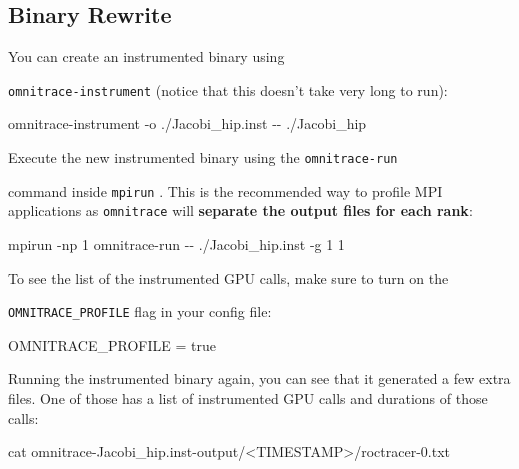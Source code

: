 \documentclass[
]{article}
\let\oldtexttt\texttt
\renewcommand{\texttt}[1]{
  \colorbox{Light}{\oldtexttt{#1}}
}
\newenvironment{Shaded}{}{}
\newcommand{\ExtensionTok}[1]{#1}
\newcommand{\FunctionTok}[1]{\textcolor[rgb]{0.02,0.16,0.49}{#1}}
\newcommand{\NormalTok}[1]{#1}
\newcommand{\OperatorTok}[1]{\textcolor[rgb]{0.40,0.40,0.40}{#1}}
\begin{document}
\hypertarget{binary-rewrite}{%
\subsection{Binary Rewrite}\label{binary-rewrite}}

You can create an instrumented binary using
\texttt{omnitrace-instrument} (notice that this doesn't take very long
to run):

\begin{Shaded}
\begin{Highlighting}[]
\ExtensionTok{omnitrace{-}instrument}\NormalTok{ {-}o ./Jacobi\_hip.inst {-}{-} ./Jacobi\_hip}
\end{Highlighting}
\end{Shaded}

Execute the new instrumented binary using the \texttt{omnitrace-run}
command inside \texttt{mpirun}. This is the recommended way to profile
MPI applications as \texttt{omnitrace} will \textbf{separate the output
files for each rank}:

\begin{Shaded}
\begin{Highlighting}[]
\ExtensionTok{mpirun}\NormalTok{ {-}np 1 omnitrace{-}run {-}{-} ./Jacobi\_hip.inst {-}g 1 1}
\end{Highlighting}
\end{Shaded}

To see the list of the instrumented GPU calls, make sure to turn on the
\texttt{OMNITRACE\_PROFILE} flag in your config file:

\begin{Shaded}
\begin{Highlighting}[]
\ExtensionTok{OMNITRACE\_PROFILE}\NormalTok{                                  = true}
\end{Highlighting}
\end{Shaded}

Running the instrumented binary again, you can see that it generated a
few extra files. One of those has a list of instrumented GPU calls and
durations of those calls:

\begin{Shaded}
\begin{Highlighting}[]
\FunctionTok{cat}\NormalTok{ omnitrace{-}Jacobi\_hip.inst{-}output/}\OperatorTok{\textless{}}\NormalTok{TIMESTAMP}\OperatorTok{\textgreater{}}\NormalTok{/roctracer{-}0.txt}
\end{Highlighting}
\end{Shaded}
\end{document}
